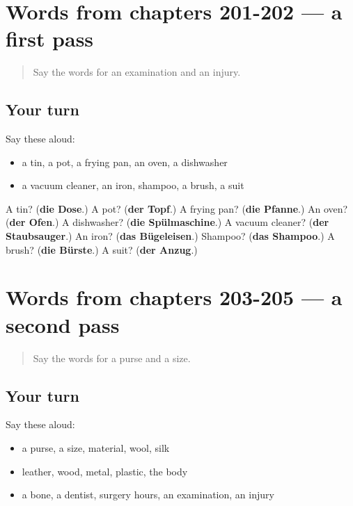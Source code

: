 \section[(dialogue)]{Words from chapters 201-202 — a first pass}

\label{lesson:GE-R205-first-pass-words-from-chapters-201-202}



\begin{quote}
Say the words for an examination and an injury.
\end{quote}

\subsection*{Your turn}
Say these aloud:

\begin{itemize}
\raggedright
  \item a tin, a pot, a frying pan, an oven, a dishwasher
  \item a vacuum cleaner, an iron, shampoo, a brush, a suit
\end{itemize}

\begin{tcolorbox}[breakable,colback=teal!4,colframe=teal!35!black,title={Before you move on}]
A tin? (\textbf{die Dose}.) A pot? (\textbf{der Topf}.) A frying pan? (\textbf{die Pfanne}.) An oven? (\textbf{der Ofen}.) A dishwasher? (\textbf{die Spülmaschine}.) A vacuum cleaner? (\textbf{der Staubsauger}.) An iron? (\textbf{das Bügeleisen}.) Shampoo? (\textbf{das Shampoo}.) A brush? (\textbf{die Bürste}.) A suit? (\textbf{der Anzug}.)
\end{tcolorbox}
\section[(dialogue)]{Words from chapters 203-205 — a second pass}

\label{lesson:GE-R205-second-pass-words-from-chapters-203-205}



\begin{quote}
Say the words for a purse and a size.
\end{quote}

\subsection*{Your turn}
Say these aloud:

\begin{itemize}
\raggedright
  \item a purse, a size, material, wool, silk
  \item leather, wood, metal, plastic, the body
  \item a bone, a dentist, surgery hours, an examination, an injury
\end{itemize}

